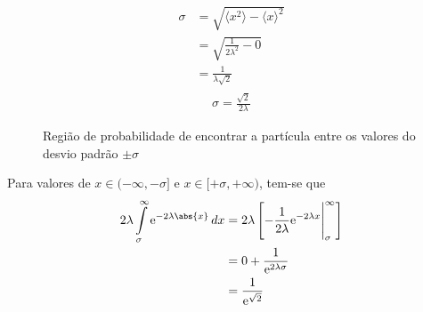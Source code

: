\begin{prob}
\begin{sol}
\begin{enumerate}[label=\alph *)]
\begin{align}
\begin{split}
						\sigma &= \sqrt{\langle x^{2} \rangle-\langle x \rangle^{2}}\\
									 &= \sqrt{\frac{1}{2 \lambda^{2}}-0}\\
									 &= \frac{1}{\lambda\sqrt{2}}
					\end{split}						
				\end{align}
				\begin{align}
					\boxed{\sigma = \frac{\sqrt{2}}{2\lambda}}
				\end{align}
				\begin{figure}[ht!]
					\centering
					
					\caption{Região de probabilidade de encontrar a partícula entre os valores do desvio padrão $\pm\sigma$}
					\label{fig:pltQ01c}
				\end{figure}
				Para valores de $x\in (-\infty, -\sigma]$ e $x\in [+\sigma,+\infty)$, tem-se que
				\begin{align}
					\begin{split}
						2 \lambda \int\limits_{\sigma}^{\infty}\mathrm{e}^{-2 \lambda\abs{x}}\,d{x} &= 2 \lambda \left[-\frac{1}{2 \lambda}\mathrm{e}^{-2 \lambda x}\Bigg|_{\sigma}^{\infty} \right]\\
																																												&= 0+\frac{1}{\mathrm{e}^{2 \lambda \sigma}}\\
																																												&= \frac{1}{\mathrm{e}^{\sqrt{2}}}
					\end{split}
				\end{align}
		\end{enumerate} 	
	\end{sol}
\end{prob}


